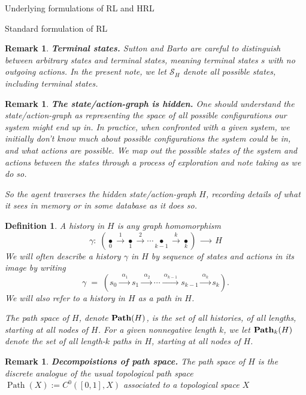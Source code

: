 \documentclass[11pt]{article}
\newtheorem{definition}[subsubsection]{Definition}
\newtheorem{remark}[subsubsection]{Remark}
\newcommand{\Path}{\operatorname{Path}}
\begin{document}
\begin{section}{Underlying formulations of RL and HRL}
\begin{subsection}{Standard formulation of RL}
\begin{remark}
{\bf Terminal states.}
\normalfont
Sutton and Barto are careful to distinguish between arbitrary states and {\em terminal} states, meaning terminal states $s$ with no outgoing actions. In the present note, we let $\mathcal{S}_{H}$ denote {\em all} possible states, including terminal states.
\end{remark}

\begin{remark}
{\bf The state/action-graph is {\em hidden}.}
\normalfont
One should understand the state/action-graph as representing the space of all possible configurations our system might end up in. In practice, when confronted with a given system, we initially don't know much about possible configurations the system could be in, and what actions are possible. We map out the possible states of the system and actions between the states through a process of exploration and note taking as we do so.

So the agent traverses the hidden state/action-graph $H$, recording details of what it sees in memory or in some database as it does so.
\end{remark}

\begin{definition}
\normalfont
A {\em history} in $H$ is any graph homomorphism
$$
\gamma:\;\left(\underset{0}{\bullet}\xrightarrow{\ \ 1\ \ }\underset{1}{\bullet}\xrightarrow{\ \ 2\ \ }\cdots\underset{k-1}{\bullet}\xrightarrow{\ \ k\ \ }\underset{k}{\bullet}\right)
\;\xrightarrow{\ \ \ \ \ \ \ }\;H
$$
We will often describe a history $\gamma$ in $H$ by sequence of states and actions in its image by writing
\begin{equation}\label{eq: general history}
\gamma\;=\;\left(s_{0}\xrightarrow{\ \ \alpha_{1}\ }s_{1}\xrightarrow{\ \ \alpha_{2}\ }\cdots\xrightarrow{\ \alpha_{k-1}\ }s_{k-1}\xrightarrow{\ \alpha_{k}\ }s_{k}\right).
\end{equation}
We will also refer to a history in $H$ as a {\em path} in $H$.

	The {\em path space} of $H$, denote $\bold{Path}(H)$, is the set of all histories, of all lengths, starting at all nodes of $H$. For a given nonnegative length $k$, we let $\bold{Path}_{k}(H)$ denote the set of all length-$k$ paths in $H$, starting at all nodes of $H$.
\end{definition}

\begin{remark}
{\bf Decompoistions of path space.}
\normalfont
The path space of $H$ is the discrete analogue of the usual topological path space $\Path(X):=C^0([0,1],X)$ associated to a topological space $X$


\end{remark}
\end{subsection}
\end{section}
\end{document}
